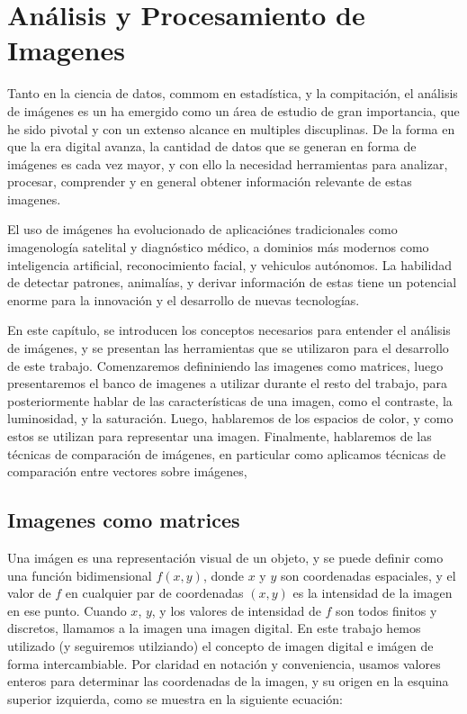 \chapter{Análisis y Procesamiento de Imagenes }\label{chap3}


Tanto en la ciencia de datos, commom en estad\'istica, y la compitaci\'on, el an\'alisis de im\'agenes es un ha emergido como un \'area de estudio de gran importancia, que he sido pivotal y con un extenso alcance en multiples discuplinas. De la forma en que la era digital avanza, la cantidad de datos que se generan en forma de im\'agenes es cada vez mayor, y con ello la necesidad herramientas para analizar, procesar, comprender y en general obtener informaci\'on relevante de estas imagenes. 

El uso de im\'agenes ha evolucionado de aplicaci\'ones tradicionales como imagenolog\'ia satelital y diagn\'ostico m\'edico, a dominios m\'as modernos como inteligencia artificial, reconocimiento facial, y vehiculos aut\'onomos. La habilidad de detectar patrones, animal\'ias, y derivar informaci\'on de estas tiene un potencial enorme para la innovaci\'on y el desarrollo de nuevas tecnolog\'ias. 

En este cap\'itulo, se introducen los conceptos necesarios para entender el an\'alisis de im\'agenes, y se presentan las herramientas que se utilizaron para el desarrollo de este trabajo. Comenzaremos defininiendo las imagenes como matrices, luego presentaremos el banco de imagenes a utilizar durante el resto del trabajo, para posteriormente hablar de las caracter\'isticas de una imagen, como el contraste, la luminosidad, y la saturaci\'on. Luego, hablaremos de los espacios de color, y como estos se utilizan para representar una imagen. Finalmente, hablaremos de las t\'ecnicas de comparaci\'on de im\'agenes, en particular como aplicamos t\'ecnicas de comparaci\'on entre vectores sobre im\'agenes,

\section{Imagenes como matrices}

Una im\'agen es una representaci\'on visual de un objeto, y se puede definir como una funci\'on bidimensional $f(x,y)$, donde $x$ y $y$ son coordenadas espaciales, y el valor de $f$ en cualquier par de coordenadas $(x,y)$ es la intensidad de la imagen en ese punto. Cuando $x$, $y$, y los valores de intensidad de $f$ son todos finitos y discretos, llamamos a la imagen una imagen digital. En este trabajo hemos utilizado (y seguiremos utilziando) el concepto de imagen digital e im\'agen de forma intercambiable. Por claridad en notaci\'on y conveniencia, usamos valores enteros para determinar las coordenadas de la imagen, y su origen en la esquina superior izquierda, como se muestra en la siguiente ecuaci\'on:

